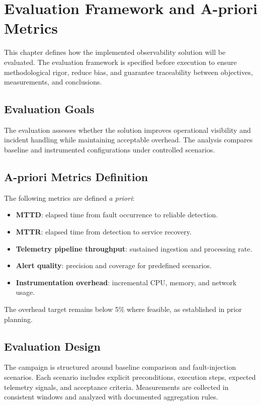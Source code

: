 \chapter{Evaluation Framework and A-priori Metrics}
\label{chap:evaluation}

This chapter defines how the implemented observability solution will be evaluated. The evaluation framework is specified before execution to ensure methodological rigor, reduce bias, and guarantee traceability between objectives, measurements, and conclusions.

\section{Evaluation Goals}

The evaluation assesses whether the solution improves operational visibility and incident handling while maintaining acceptable overhead. The analysis compares baseline and instrumented configurations under controlled scenarios.

\section{A-priori Metrics Definition}

The following metrics are defined \textit{a priori}:
\begin{itemize}
    \item \textbf{\ac{MTTD}}: elapsed time from fault occurrence to reliable detection.
    \item \textbf{\ac{MTTR}}: elapsed time from detection to service recovery.
    \item \textbf{Telemetry pipeline throughput}: sustained ingestion and processing rate.
    \item \textbf{Alert quality}: precision and coverage for predefined scenarios.
    \item \textbf{Instrumentation overhead}: incremental CPU, memory, and network usage.
\end{itemize}

The overhead target remains below 5\% where feasible, as established in prior planning.

\section{Evaluation Design}

The campaign is structured around baseline comparison and fault-injection scenarios. Each scenario includes explicit preconditions, execution steps, expected telemetry signals, and acceptance criteria. Measurements are collected in consistent windows and analyzed with documented aggregation rules.

